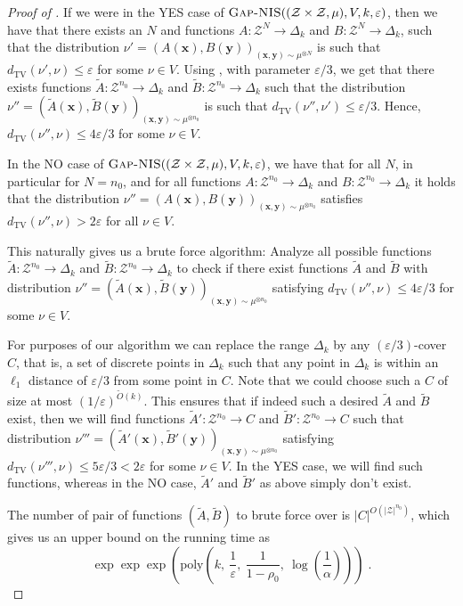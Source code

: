 \documentclass[11pt]{article}
\newcommand{\inparen}[1]{\left ( #1 \right )}
\newcommand{\wtilde}[1]{\widetilde{#1}}
\newcommand{\dTV}{d_{\mathrm{TV}}}
\newcommand{\eps}{\varepsilon}
\newcommand{\bx}{{\bm x}}
\newcommand{\by}{{\bm y}}
\newcommand{\calZ}{\mathcal{Z}}
\newcommand{\poly}{\mathrm{poly}}
\newcommand{\ANIS}{\text{\sc Gap-NIS}}
\begin{document}
\begin{proof}[Proof of ]
	If we were in the YES case of $\ANIS((\calZ \times \calZ, \mu), V, k, \eps)$, then we have that there exists an $N$ and functions $A : \calZ^N \to \Delta_k$ and $B : \calZ^N \to \Delta_k$, such that the distribution $\nu' = (A(\bx), B(\by))_{(\bx, \by) \sim \mu^{\otimes N}}$ is such that $\dTV(\nu', \nu) \le \eps$ for some $\nu \in V$. Using , with parameter $\eps/3$, we get that there exists functions $\wtilde{A} : \calZ^{n_0} \to \Delta_k$ and $\wtilde{B} : \calZ^{n_0} \to \Delta_k$ such that the distribution $\nu'' = (\wtilde{A}(\bx), \wtilde{B}(\by))_{(\bx, \by) \sim \mu^{\otimes n_0}}$ is such that $\dTV(\nu'', \nu') \le \eps/3$. Hence, $\dTV(\nu'', \nu) \le 4\eps/3$ for some $\nu \in V$.
	
	In the NO case of $\ANIS((\calZ \times \calZ, \mu), V, k, \eps)$, we have that for all $N$, in particular for $N = n_0$, and for all functions $A : \calZ^{n_0} \to \Delta_k$ and $B : \calZ^{n_0} \to \Delta_k$ it holds that the distribution $\nu'' = (A(\bx), B(\by))_{(\bx, \by) \sim \mu^{\otimes n_0}}$ satisfies $\dTV(\nu'', \nu) > 2\eps$ for all $\nu \in V$.
	
	This naturally gives us a brute force algorithm: Analyze all possible functions $\wtilde{A} : \calZ^{n_0} \to \Delta_k$ and $\wtilde{B} : \calZ^{n_0} \to \Delta_k$ to check if there exist functions $\wtilde{A}$ and $\wtilde{B}$ with distribution $\nu'' = (\wtilde{A}(\bx), \wtilde{B}(\by))_{(\bx, \by) \sim \mu^{\otimes n_0}}$ satisfying $\dTV(\nu'', \nu) \le 4\eps/3$ for some $\nu \in V$.
	
	For purposes of our algorithm we can replace the range $\Delta_k$ by any $(\eps/3)$-cover $C$, that is, a set of discrete points in $\Delta_k$ such that any point in $\Delta_k$ is within an $\ell_1$ distance of $\eps/3$ from some point in $C$. Note that we could choose such a $C$ of size at most $(1/\eps)^{\wtilde{O}(k)}$. This ensures that if indeed such a desired $\wtilde{A}$ and $\wtilde{B}$ exist, then we will find functions $\wtilde{A}' : \calZ^{n_0} \to C$ and $\wtilde{B}' : \calZ^{n_0} \to C$ such that distribution $\nu''' = (\wtilde{A}'(\bx), \wtilde{B}'(\by))_{(\bx, \by) \sim \mu^{\otimes n_0}}$ satisfying $\dTV(\nu''', \nu) \le 5\eps/3 < 2\eps$ for some $\nu \in V$. In the YES case, we will find such functions, whereas in the NO case, $\wtilde{A}'$ and $\wtilde{B}'$ as above simply don't exist.
	
	The number of pair of functions $(\wtilde{A}, \wtilde{B})$ to brute force over is $|C|^{O(|\calZ|^{n_0})}$, which gives us an upper bound on the running time as
	\[\exp\exp\exp\inparen{\poly\inparen{k, \ \frac{1}{\eps}, \ \frac{1}{1-\rho_0}, \ \log\inparen{\frac{1}{\alpha}}}}\;.\]
\end{proof}

\end{document}
